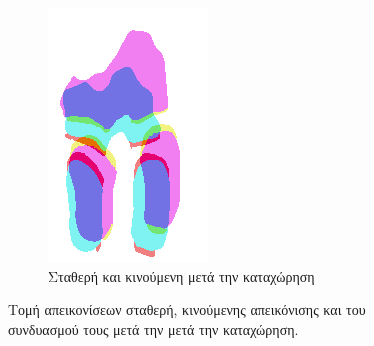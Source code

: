 \documentclass[a4paper,12pt]{article}
\begin{document}
\begin{figure}[H]
    \begin{subfigure}[t]{0.4\linewidth}
    \includegraphics[width=\linewidth]{combination_label_before_registration_2.png}
    \caption{Σταθερή και κινούμενη μετά την καταχώρηση}
    \end{subfigure}

    \caption{Τομή απεικονίσεων σταθερή, κινούμενης απεικόνισης και του
             συνδυασμού τους μετά την μετά την καταχώρηση.}
    \label{fig:registration_before:2}
\end{figure}
\end{document}
